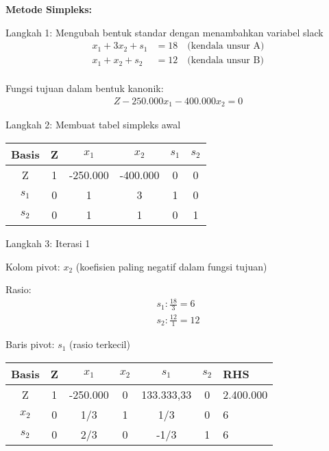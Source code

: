 \documentclass[12pt,a4paper]{article}
\begin{document}
\begin{enumerate}
    \textbf{Metode Simpleks:}
    
    Langkah 1: Mengubah bentuk standar dengan menambahkan variabel slack
    \begin{align*}
    x_1 + 3x_2 + s_1 &= 18 \quad \text{(kendala unsur A)}\\  
    x_1 + x_2 + s_2 &= 12 \quad \text{(kendala unsur B)}\\  
    \end{align*}
    
    Fungsi tujuan dalam bentuk kanonik:
    \begin{align*}
    Z - 250.000x_1 - 400.000x_2 = 0
    \end{align*}
    
    Langkah 2: Membuat tabel simpleks awal
    
    \begin{table}[H]
    \centering
    \begin{tabular}{|c|c|c|c|c|c|}
    \hline
    Basis & Z & $x_1$ & $x_2$ & $s_1$ & $s_2$ \\
    \hline
    Z & 1 & -250.000 & -400.000 & 0 & 0 \\
    $s_1$ & 0 & 1 & 3 & 1 & 0  \\
    $s_2$ & 0 & 1 & 1 & 0 & 1  \\
    \hline
    \end{tabular}
    \end{table}
    
    Langkah 3: Iterasi 1
    
    Kolom pivot: $x_2$ (koefisien paling negatif dalam fungsi tujuan)
    
    Rasio:
    \begin{align*}
    s_1: \frac{18}{3} = 6\\  
    s_2: \frac{12}{1} = 12
    \end{align*}
    
    Baris pivot: $s_1$ (rasio terkecil)
    
    \begin{table}[H]
    \centering
    \begin{tabular}{|c|c|c|c|c|c|}
    \hline
    Basis & Z & $x_1$ & $x_2$ & $s_1$ & $s_2$ & RHS \\
    \hline
    Z & 1 & -250.000 & 0 & 133.333,33 & 0 & 2.400.000 \\
    $x_2$ & 0 & 1/3 & 1 & 1/3 & 0 & 6 \\
    $s_2$ & 0 & 2/3 & 0 & -1/3 & 1 & 6 \\
    \hline
    \end{tabular}
    \end{table}
    

\end{enumerate}
\end{document}
